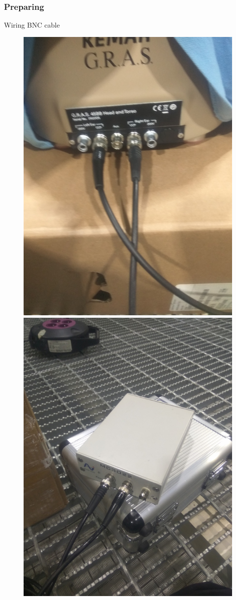 \documentclass[table,dvipsnames,10pt]{beamer}
\begin{document}
	\begin{frame}
	\frametitle{Preparing}
	\begin{exampleblock}{Wiring BNC cable}
		\begin{figure}[H]
			\centering
			\includegraphics[width=0.3\linewidth]{day_1/wiring0}
			\includegraphics[width=0.3\linewidth]{day_1/wiring1}
		\end{figure}
	\end{exampleblock}
	\end{frame}
\end{document}
